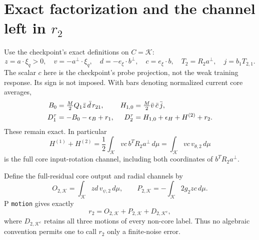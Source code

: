 \documentclass[11pt]{article}
\newcommand{\dd}{\,d}
\newcommand{\K}{\mathcal K}
\begin{document}
\section{Exact factorization and the channel left in \texorpdfstring{\(r_2\)}{r2}}
\label{an01bcv1:channels}
Use the checkpoint's exact definitions on \(C=\K\):
\[
 z=a\cdot\xi_q>0,\quad v=-a^\perp\cdot\xi_q,\quad
 d=-e_\xi\cdot b^\perp,\quad c=e_\xi\cdot b,\quad
 T_2=R_2a^\perp,\quad j=b_1T_{2,1}.
\]
The scalar \(c\) here is the checkpoint's probe projection, not the
weak training response. Its sign is not imposed.
With bars denoting normalized current core averages,
\begin{align}
 B_0&=\tfrac M2Q_1\bar z\,\bar d\,r_{21},&
 H_{1,0}&=\tfrac M2\bar v\,\bar c\,\bar j,\notag\\
 D_1^\tau&=-B_0-\epsilon_B+r_1,&
 D_2^\tau&=H_{1,0}+\epsilon_H+H^{(2)}+r_2.
 \label{an01bcv1:exactfactor}
\end{align}
These remain exact. In particular
\begin{equation}
 H^{(1)}+H^{(2)}
 =\frac12\int_\K vc\,b^TR_2a^\perp\dd\mu
 =\int_\K vc\,v_{\theta,2}\dd\mu
 \label{an01bcv1:inputchannel}
\end{equation}
is the full core input-rotation channel, including both coordinates
of \(b^TR_2a^\perp\).

Define the full-residual core output and radial channels by
\[
 O_{2,\K}=\int_\K zd\,v_{\psi,2}\dd\mu,\qquad
 P_{2,\K}=-\int_\K 2g_2zc\dd\mu.
\]
P \texttt{motion} gives exactly
\begin{equation}
 r_2=O_{2,\K}+P_{2,\K}+D_{2,\K^c},
 \label{an01bcv1:r2identity}
\end{equation}
where \(D_{2,\K^c}\) retains all three motions of every non-core
label. Thus no algebraic convention permits one to call \(r_2\)
only a finite-noise error.
\end{document}
